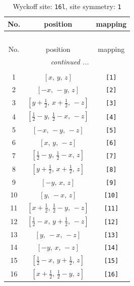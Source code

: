 \documentclass[fleqn,8pt]{jsarticle}
\begin{document}
\begin{longtable}{ccc}
\caption{Wyckoff site: {\tt 16l}, site symmetry: {\tt 1}}
 \\
 \hline \hline
No. & position & mapping \\ \hline \endfirsthead

\multicolumn{2}{l}{\tablename\ \thetable{}} \\
 \hline \hline
No. & position & mapping \\ \hline \endhead

 \hline \hline
\multicolumn{2}{r}{\footnotesize\it continued ...} \\ \endfoot

 \hline \hline
\multicolumn{2}{r}{} \\ \endlastfoot

1 & $\left[ x,\, y,\, z \right]$ & {\tt [1]} \\ \hline
2 & $\left[ - x,\, - y,\, z \right]$ & {\tt [2]} \\ \hline
3 & $\left[ y + \frac{1}{2},\, x + \frac{1}{2},\, - z \right]$ & {\tt [3]} \\ \hline
4 & $\left[ \frac{1}{2} - y,\, \frac{1}{2} - x,\, - z \right]$ & {\tt [4]} \\ \hline
5 & $\left[ - x,\, - y,\, - z \right]$ & {\tt [5]} \\ \hline
6 & $\left[ x,\, y,\, - z \right]$ & {\tt [6]} \\ \hline
7 & $\left[ \frac{1}{2} - y,\, \frac{1}{2} - x,\, z \right]$ & {\tt [7]} \\ \hline
8 & $\left[ y + \frac{1}{2},\, x + \frac{1}{2},\, z \right]$ & {\tt [8]} \\ \hline
9 & $\left[ - y,\, x,\, z \right]$ & {\tt [9]} \\ \hline
10 & $\left[ y,\, - x,\, z \right]$ & {\tt [10]} \\ \hline
11 & $\left[ x + \frac{1}{2},\, \frac{1}{2} - y,\, - z \right]$ & {\tt [11]} \\ \hline
12 & $\left[ \frac{1}{2} - x,\, y + \frac{1}{2},\, - z \right]$ & {\tt [12]} \\ \hline
13 & $\left[ y,\, - x,\, - z \right]$ & {\tt [13]} \\ \hline
14 & $\left[ - y,\, x,\, - z \right]$ & {\tt [14]} \\ \hline
15 & $\left[ \frac{1}{2} - x,\, y + \frac{1}{2},\, z \right]$ & {\tt [15]} \\ \hline
16 & $\left[ x + \frac{1}{2},\, \frac{1}{2} - y,\, z \right]$ & {\tt [16]} \\
\end{longtable}
\end{document}
